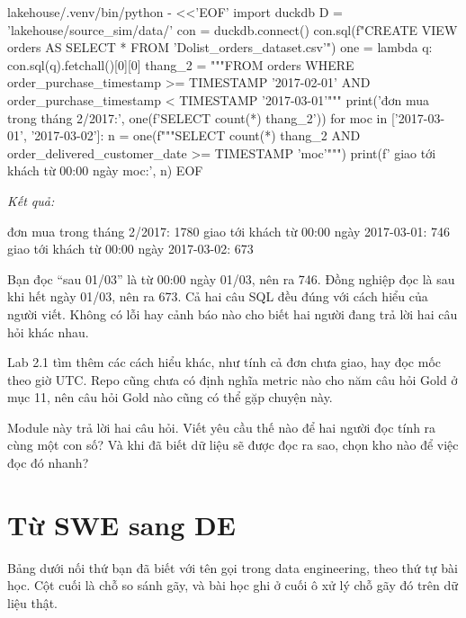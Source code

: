 \begin{codeblock}
lakehouse/.venv/bin/python - <<'EOF'
import duckdb
D = 'lakehouse/source_sim/data/'
con = duckdb.connect()
con.sql(f"CREATE VIEW orders AS SELECT * FROM '{D}olist_orders_dataset.csv'")
one = lambda q: con.sql(q).fetchall()[0][0]
thang_2 = """FROM orders WHERE order_purchase_timestamp >= TIMESTAMP '2017-02-01'
                         AND order_purchase_timestamp <  TIMESTAMP '2017-03-01'"""
print('đơn mua trong tháng 2/2017:', one(f'SELECT count(*) {thang_2}'))
for moc in ['2017-03-01', '2017-03-02']:
    n = one(f"""SELECT count(*) {thang_2}
                AND order_delivered_customer_date >= TIMESTAMP '{moc}'""")
    print(f'  giao tới khách từ 00:00 ngày {moc}:', n)
EOF
\end{codeblock}
\textit{Kết quả:}
\begin{codeblock}
đơn mua trong tháng 2/2017: 1780
  giao tới khách từ 00:00 ngày 2017-03-01: 746
  giao tới khách từ 00:00 ngày 2017-03-02: 673
\end{codeblock}

Bạn đọc ``sau 01/03'' là từ 00:00 ngày 01/03, nên ra 746. Đồng nghiệp đọc là sau khi hết ngày 01/03, nên ra 673. Cả hai câu SQL đều đúng với cách hiểu của người viết. Không có lỗi hay cảnh báo nào cho biết hai người đang trả lời hai câu hỏi khác nhau.

Lab 2.1 tìm thêm các cách hiểu khác, như tính cả đơn chưa giao, hay đọc mốc theo giờ UTC. Repo  cũng chưa có định nghĩa metric nào cho năm câu hỏi Gold ở  mục 11, nên câu hỏi Gold nào cũng có thể gặp chuyện này.

Module này trả lời hai câu hỏi. Viết yêu cầu thế nào để hai người đọc tính ra cùng một con số? Và khi đã biết dữ liệu sẽ được đọc ra sao, chọn kho nào để việc đọc đó nhanh?

\section{Từ SWE sang DE}

Bảng dưới nối thứ bạn đã biết với tên gọi trong data engineering, theo thứ tự bài học. Cột cuối là chỗ so sánh gãy, và bài học ghi ở cuối ô xử lý chỗ gãy đó trên dữ liệu thật.

